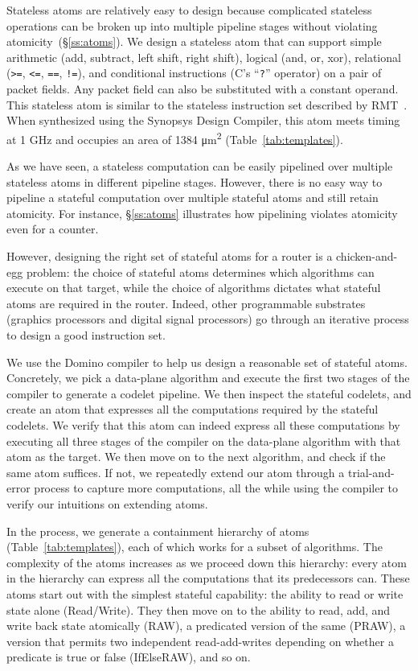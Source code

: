 Stateless atoms are relatively easy to design because complicated stateless
operations can be broken up into multiple pipeline stages without violating
atomicity~(\S\ref{ss:atoms}). We design a stateless atom that can support
simple arithmetic (add, subtract, left shift, right shift), logical (and, or,
xor), relational ({\tt >=}, {\tt <=}, {\tt ==}, {\tt !=}), and conditional
instructions (C's ``{\tt ?}'' operator) on a pair of packet fields. Any packet
field can also be substituted with a constant operand. This stateless atom is
similar to the stateless instruction set described by RMT~\cite{rmt}. When
synthesized using the Synopsys Design Compiler, this atom meets timing at 1 GHz
and occupies an area of 1384 \si{\micro\meter\squared}
(Table~\ref{tab:templates}).

As we have seen, a stateless computation can be easily pipelined over multiple
stateless atoms in different pipeline stages. However, there is no easy way to
pipeline a stateful computation over multiple stateful atoms and still retain
atomicity.  For instance, \S\ref{ss:atoms} illustrates how pipelining violates
atomicity even for a counter.

However, designing the right set of stateful atoms for a router is a
chicken-and-egg problem: the choice of stateful atoms determines which
algorithms can execute on that target, while the choice of algorithms dictates
what stateful atoms are required in the router. Indeed, other programmable
substrates (\eg graphics processors and digital signal processors) go through
an iterative process to design a good instruction set.

 We use the Domino compiler to help us design a reasonable set of stateful
atoms.  Concretely, we pick a data-plane algorithm and execute the first two
stages of the \pktlanguage compiler to generate a codelet pipeline.  We then
inspect the stateful codelets, and create an atom that expresses all the
computations required by the stateful codelets. We verify that this atom can
indeed express all these computations by executing all three stages of the
compiler on the data-plane algorithm with that atom as the target. We then move
on to the next algorithm, and check if the same atom suffices. If not, we
repeatedly extend our atom through a trial-and-error process to capture more
computations, all the while using the compiler to verify our intuitions on
extending atoms.

In the process, we generate a containment hierarchy of atoms
(Table~\ref{tab:templates}), each of which works for a subset of algorithms.
The complexity of the atoms increases as we proceed down this hierarchy: every
atom in the hierarchy can express all the computations that its predecessors
can. These atoms start out with the simplest stateful capability: the ability
to read or write state alone (Read/Write).  They then move on to the ability to
read, add, and write back state atomically (RAW), a predicated version of the
same (PRAW), a version that permits two independent read-add-writes depending
on whether a predicate is true or false (IfElseRAW), and so on.

